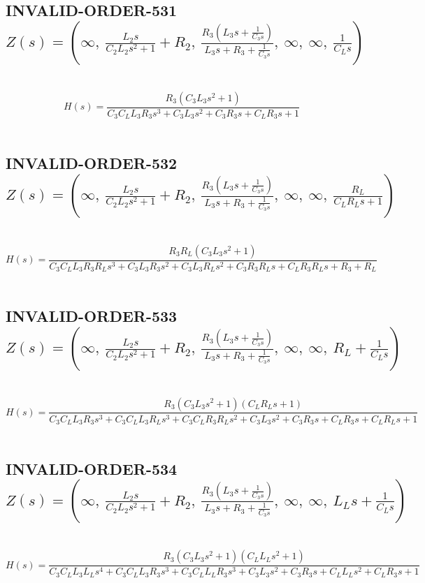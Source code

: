 \documentclass{article}
\begin{document}
\subsection{INVALID-ORDER-531 $Z(s) = \left( \infty, \  \frac{L_{2} s}{C_{2} L_{2} s^{2} + 1} + R_{2}, \  \frac{R_{3} \left(L_{3} s + \frac{1}{C_{3} s}\right)}{L_{3} s + R_{3} + \frac{1}{C_{3} s}}, \  \infty, \  \infty, \  \frac{1}{C_{L} s}\right)$ } \ 
\textbf{\[H(s) = \frac{R_{3} \left(C_{3} L_{3} s^{2} + 1\right)}{C_{3} C_{L} L_{3} R_{3} s^{3} + C_{3} L_{3} s^{2} + C_{3} R_{3} s + C_{L} R_{3} s + 1}\] } \ 
\subsection{INVALID-ORDER-532 $Z(s) = \left( \infty, \  \frac{L_{2} s}{C_{2} L_{2} s^{2} + 1} + R_{2}, \  \frac{R_{3} \left(L_{3} s + \frac{1}{C_{3} s}\right)}{L_{3} s + R_{3} + \frac{1}{C_{3} s}}, \  \infty, \  \infty, \  \frac{R_{L}}{C_{L} R_{L} s + 1}\right)$ } \ 
\textbf{\[H(s) = \frac{R_{3} R_{L} \left(C_{3} L_{3} s^{2} + 1\right)}{C_{3} C_{L} L_{3} R_{3} R_{L} s^{3} + C_{3} L_{3} R_{3} s^{2} + C_{3} L_{3} R_{L} s^{2} + C_{3} R_{3} R_{L} s + C_{L} R_{3} R_{L} s + R_{3} + R_{L}}\] } \ 
\subsection{INVALID-ORDER-533 $Z(s) = \left( \infty, \  \frac{L_{2} s}{C_{2} L_{2} s^{2} + 1} + R_{2}, \  \frac{R_{3} \left(L_{3} s + \frac{1}{C_{3} s}\right)}{L_{3} s + R_{3} + \frac{1}{C_{3} s}}, \  \infty, \  \infty, \  R_{L} + \frac{1}{C_{L} s}\right)$ } \ 
\textbf{\[H(s) = \frac{R_{3} \left(C_{3} L_{3} s^{2} + 1\right) \left(C_{L} R_{L} s + 1\right)}{C_{3} C_{L} L_{3} R_{3} s^{3} + C_{3} C_{L} L_{3} R_{L} s^{3} + C_{3} C_{L} R_{3} R_{L} s^{2} + C_{3} L_{3} s^{2} + C_{3} R_{3} s + C_{L} R_{3} s + C_{L} R_{L} s + 1}\] } \ 
\subsection{INVALID-ORDER-534 $Z(s) = \left( \infty, \  \frac{L_{2} s}{C_{2} L_{2} s^{2} + 1} + R_{2}, \  \frac{R_{3} \left(L_{3} s + \frac{1}{C_{3} s}\right)}{L_{3} s + R_{3} + \frac{1}{C_{3} s}}, \  \infty, \  \infty, \  L_{L} s + \frac{1}{C_{L} s}\right)$ } \ 
\textbf{\[H(s) = \frac{R_{3} \left(C_{3} L_{3} s^{2} + 1\right) \left(C_{L} L_{L} s^{2} + 1\right)}{C_{3} C_{L} L_{3} L_{L} s^{4} + C_{3} C_{L} L_{3} R_{3} s^{3} + C_{3} C_{L} L_{L} R_{3} s^{3} + C_{3} L_{3} s^{2} + C_{3} R_{3} s + C_{L} L_{L} s^{2} + C_{L} R_{3} s + 1}\] } \ 
\end{document}
